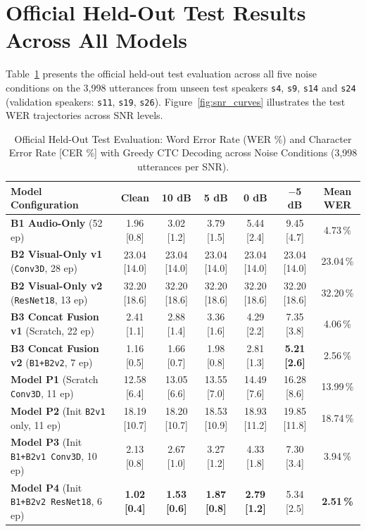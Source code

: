 \documentclass[11pt,a4paper]{article}
\newcommand{\code}[1]{\texttt{\small #1}}
\begin{document}
\section{Official Held-Out Test Results Across All Models}

Table~\ref{tab:baseline_results} presents the official held-out test evaluation across all five noise conditions on the 3,998 utterances from unseen test speakers \code{s4}, \code{s9}, \code{s14} and \code{s24} (validation speakers: \code{s11}, \code{s19}, \code{s26}). Figure~\ref{fig:snr_curves} illustrates the test WER trajectories across SNR levels.

\begin{table}[htbp]
\centering\small
\caption{Official Held-Out Test Evaluation: Word Error Rate (WER \%) and Character Error Rate [CER \%] with Greedy CTC Decoding across Noise Conditions (3,998 utterances per SNR).}
\label{tab:baseline_results}
\begin{tabularx}{\textwidth}{@{}Xcccccc@{}}
\toprule
\rowcolor{white}\sffamily\bfseries Model Configuration & \textbf{Clean} & \textbf{10 dB} & \textbf{5 dB} & \textbf{0 dB} & \textbf{$-$5 dB} & \textbf{Mean WER} \\
\midrule
\textbf{B1 Audio-Only} (52 ep) & 1.96 [0.8] & 3.02 [1.2] & 3.79 [1.5] & 5.44 [2.4] & 9.45 [4.7] & 4.73\,\% \\
\textbf{B2 Visual-Only v1} (\code{Conv3D}, 28 ep) & 23.04 [14.0] & 23.04 [14.0] & 23.04 [14.0] & 23.04 [14.0] & 23.04 [14.0] & 23.04\,\% \\
\textbf{B2 Visual-Only v2} (\code{ResNet18}, 13 ep) & 32.20 [18.6] & 32.20 [18.6] & 32.20 [18.6] & 32.20 [18.6] & 32.20 [18.6] & 32.20\,\% \\
\textbf{B3 Concat Fusion v1} (Scratch, 22 ep) & 2.41 [1.1] & 2.88 [1.4] & 3.36 [1.6] & 4.29 [2.2] & 7.35 [3.8] & 4.06\,\% \\
\textbf{B3 Concat Fusion v2} (\code{B1+B2v2}, 7 ep) & 1.16 [0.5] & 1.66 [0.7] & 1.98 [0.8] & 2.81 [1.3] & \textbf{5.21 [2.6]} & 2.56\,\% \\
\textbf{Model P1} (Scratch \code{Conv3D}, 11 ep) & 12.58 [6.4] & 13.05 [6.6] & 13.55 [7.0] & 14.49 [7.6] & 16.28 [8.6] & 13.99\,\% \\
\textbf{Model P2} (Init \code{B2v1} only, 11 ep) & 18.19 [10.7] & 18.20 [10.7] & 18.53 [10.9] & 18.93 [11.2] & 19.85 [11.8] & 18.74\,\% \\
\textbf{Model P3} (Init \code{B1+B2v1 Conv3D}, 10 ep) & 2.13 [0.8] & 2.67 [1.0] & 3.27 [1.2] & 4.33 [1.8] & 7.30 [3.4] & 3.94\,\% \\
\textbf{Model P4} (Init \code{B1+B2v2 ResNet18}, 6 ep) & \textbf{1.02 [0.4]} & \textbf{1.53 [0.6]} & \textbf{1.87 [0.8]} & \textbf{2.79 [1.2]} & 5.34 [2.5] & \textbf{2.51\,\%} \\
\bottomrule
\end{tabularx}
\end{table}
\end{document}
